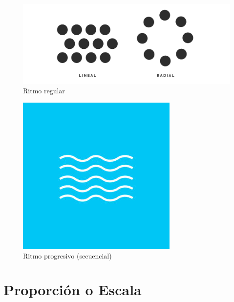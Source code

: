 \documentclass[
  16pt,
]{krantz}
\theoremstyle{definition}
\theoremstyle{definition}
\theoremstyle{definition}
\theoremstyle{definition}
\theoremstyle{remark}
\begin{document}
\begin{figure}

{\centering \includegraphics[width=1\linewidth,height=1\textheight]{ritmo} 

}

\caption{Ritmo regular}\label{fig:rythm}
\end{figure}

\begin{figure}

{\centering \includegraphics[width=1\linewidth,height=1\textheight]{ritmoo} 

}

\caption{Ritmo progresivo (secuencial)}\label{fig:rythmm}
\end{figure}

\hypertarget{proporciuxf3n-o-escala}{%
\section{Proporción o Escala}\label{proporciuxf3n-o-escala}}
\end{document}
